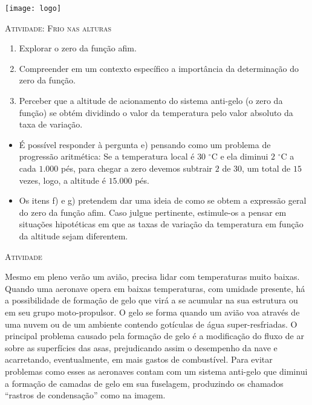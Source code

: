 \documentclass[10 pt,usenames,dvipsnames, oneside]{article}
\begin{document}
\begin{center}
  \begin{minipage}[l]{3cm}
\texttt{[image: logo]}    
\end{minipage}\hfill
\begin{minipage}[r]{.8\textwidth}
 {\Large \scshape Atividade: Frio nas alturas}  
\end{minipage}
\end{center}
\vspace{.2cm}

\ifdefined\prof
\begin{objetivos}
\item \phantom{a}
\end{objetivos}

\begin{goals}
\begin{enumerate}
\item Explorar o zero da função afim.
\item Compreender em um contexto específico a importância da determinação do zero da função.
\item Perceber que a altitude de acionamento do sistema anti-gelo (o zero da função) se obtém dividindo o valor da temperatura pelo valor absoluto da taxa de variação.
\end{enumerate}

\tcblower

\begin{itemize}
\item É possível responder à pergunta e) pensando como um problema de progressão aritmética: Se a temperatura local é $30$ $^{\circ}$C e ela diminui $2$ $^{\circ}$C a cada $1.000$ pés, para chegar a zero devemos subtrair $2$ de $30$, um total de $15$ vezes, logo, a altitude é $15.000$ pés.
\item Os itens f) e g) pretendem dar uma ideia de como se obtem a expressão geral do zero da função afim. Caso julgue pertinente, estimule-os a pensar em situações hipotéticas em que as taxas de variação da temperatura em função da altitude sejam diferentem.
\end{itemize}

\end{goals}

\bigskip
\begin{center}
{\large \scshape Atividade}
\end{center}
\fi

Mesmo em pleno verão um avião, precisa lidar com temperaturas muito baixas. Quando uma aeronave opera em baixas temperaturas, com umidade presente, há a possibilidade de formação de gelo que virá a se acumular na sua estrutura ou em seu grupo moto-propulsor. O gelo se forma quando um avião voa através de uma nuvem ou de um ambiente contendo gotículas de água super-resfriadas. O principal problema causado pela formação de gelo é a modificação do fluxo de ar sobre as superfícies das asas, prejudicando assim o desempenho da nave e acarretando, eventualmente, em mais gastos de combustível. Para evitar problemas como esses as aeronaves contam com um sistema anti-gelo que diminui a formação de camadas de gelo em sua fuselagem, produzindo os chamados “rastros de condensação” como na imagem.
\end{document}
